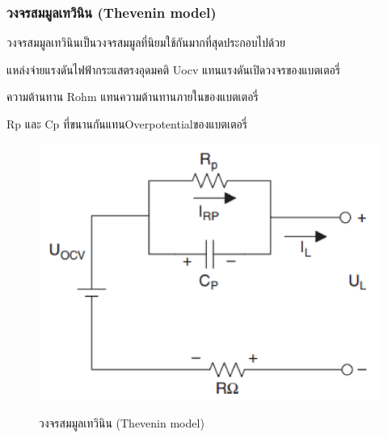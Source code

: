 \subsubsection*{วงจรสมมูลเทวินิน (Thevenin model)}
วงจรสมมูลเทวินินเป็นวงจรสมมูลที่นิยมใช้กันมากที่สุดประกอบไปด้วย
\begin{itemize}
{\item 	แหล่งจ่ายแรงดันไฟฟ้ากระแสตรงอุดมคติ Uocv แทนแรงดันเปิดวงจรของแบตเตอรี่}
{\item 	ความต้านทาน Rohm แทนความต้านทานภายในของแบตเตอรี่}
{\item 	Rp และ Cp ที่ขนานกันแทนOverpotentialของแบตเตอรี่}
\end{itemize}
\begin{center}
	\begin{figure}[H]
		\includegraphics[width=0.6\linewidth]{Chapters/img/Thevenin_model.png}
			\centering
			\captionsetup{justification=centering,margin=2cm}
			\caption{วงจรสมมูลเทวินิน (Thevenin model)}
			\cite{jiangzhang2015}
	\end{figure}
\end{center}
